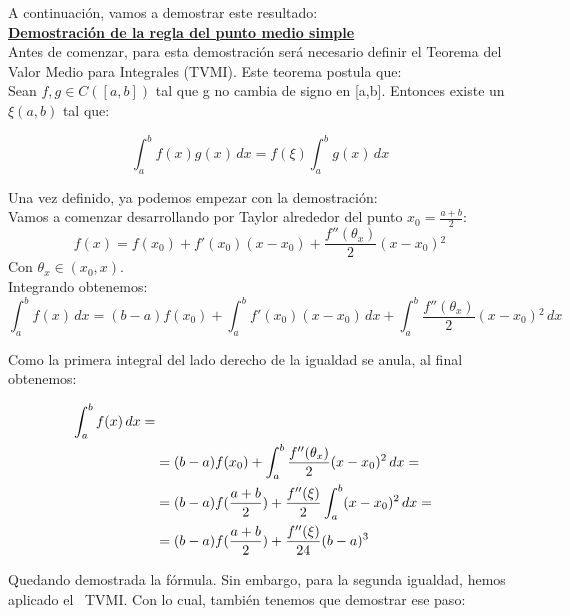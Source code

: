 \documentclass{article}
\begin{document}
			A continuación, vamos a demostrar este resultado:\\
			
			\underline{\textbf{Demostración de la regla del punto medio simple}} \\
			
			Antes de comenzar, para esta demostración será necesario definir  el Teorema del Valor Medio para Integrales (TVMI). Este teorema postula que:\\ 
			
			Sean $f,g \in C([a,b])$ tal que g no cambia de signo en [a,b]. Entonces existe un $\xi (a,b)$ tal que:
			
			\begin{equation}
				\int_{a}^{b} f(x)g(x) \,dx =f(\xi)\int_{a}^{b} g(x) \,dx 
			\end{equation}
			
			Una vez definido, ya podemos empezar con la demostración: \\

			Vamos a comenzar desarrollando por Taylor alrededor del punto
			$x_0=\frac{a+b}{2}$:
			\begin{equation}
				f(x)=f(x_0)+f'(x_0)(x-x_0)+\frac{f''(\theta_x)}{2}(x-x_0){^2} 
			\end{equation}
			Con $\theta_x \in (x_0,x)$. \\

			Integrando obtenemos: 
			\begin{equation}
				\int_{a}^{b} f(x) \,dx=(b-a)f(x_0)+\int_{a}^{b} f'(x_0)(x-x_0) \,dx+\int_{a}^{b} \frac{f''(\theta_x)}{2} (x-x_0){^2} \,dx       
			\end{equation}
			
			Como la primera integral del lado derecho de la igualdad se anula, al final obtenemos:
			
			\begin{align}
				\int_{a}^{b} f(x) \,dx= \notag \\
				&=(b-a)f(x_0)+\int_{a}^{b} \frac{f''(\theta_x)}{2} (x-x_0){^2} \,dx= \notag \\
				&=(b-a)f(\frac{a+b}{2})+\frac{f''(\xi)}{2}\int_{a}^{b} (x-x_0){^2} \,dx= \notag \\
				&=(b-a)f(\frac{a+b}{2})+\frac{f''(\xi)}{24}(b-a){^3} 
			\end{align}
			
			Quedando demostrada la fórmula. Sin embargo,  para la segunda igualdad, hemos aplicado el ~TVMI. Con lo cual, también tenemos que demostrar ese paso: \\
\end{document}
